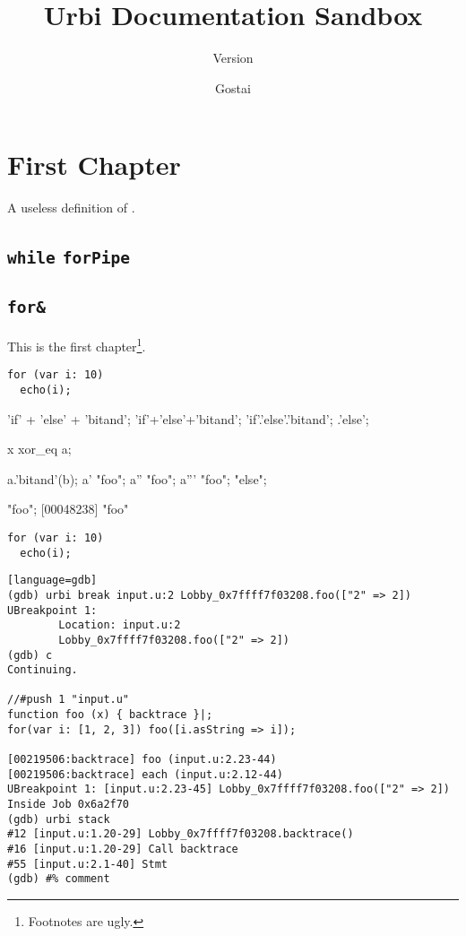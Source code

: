 \documentclass[openright,twoside,11pt]{book}
\title{Urbi Documentation Sandbox}
\subtitle{Version \VcsDescription}
\author{Gostai}
\begin{document}
\maketitle
\tableofcontents
\chapter{First Chapter}

A useless definition of .

\section{\lstinline{while} \lstinline{forPipe}}
\section{\texorpdfstring{\lstinline{for&}}{for\&}}

This is the first chapter\footnote{Footnotes are ugly.}.

\begin{verbatim}
for (var i: 10)
  echo(i);
\end{verbatim}

\begin{urbiunchecked}
'if' + 'else' + 'bitand';
'if'+'else'+'bitand';
'if'.'else'.'bitand';
.'else';

x xor_eq a;

a.'bitand'(b);
a' "foo";
a'' "foo";
a''' "foo";
"else";

"foo";
[00048238] "foo"
\end{urbiunchecked}


\begin{verbatim}
for (var i: 10)
  echo(i);
\end{verbatim}

\begin{verbatim}[language=gdb]
(gdb) urbi break input.u:2 Lobby_0x7ffff7f03208.foo(["2" => 2])
UBreakpoint 1:
        Location: input.u:2
        Lobby_0x7ffff7f03208.foo(["2" => 2])
(gdb) c
Continuing.

//#push 1 "input.u"
function foo (x) { backtrace }|;
for(var i: [1, 2, 3]) foo([i.asString => i]);

[00219506:backtrace] foo (input.u:2.23-44)
[00219506:backtrace] each (input.u:2.12-44)
UBreakpoint 1: [input.u:2.23-45] Lobby_0x7ffff7f03208.foo(["2" => 2])
Inside Job 0x6a2f70
(gdb) urbi stack
#12 [input.u:1.20-29] Lobby_0x7ffff7f03208.backtrace()
#16 [input.u:1.20-29] Call backtrace
#55 [input.u:2.1-40] Stmt
(gdb) #% comment
\end{verbatim}
\end{document}
